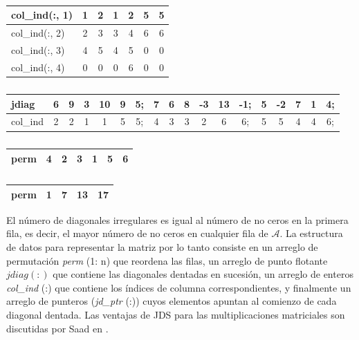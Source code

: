 \documentclass[a4paper,openright,12pt, oneside]{book}
\begin{document}
\begin{table}[htdp]
    
    \centering
    \begin{tabular}{| l || c | c | c | c | c | c |}
        \hline
      col\_ind(:, 1) & 1 & 2 & 1 & 2 & 5 & 5 \\ \hline
      col\_ind(:, 2) & 2 & 3 & 3 & 4 & 6 & 6 \\ \hline
      col\_ind(:, 3) & 4 & 5 & 4 & 5 & 0 & 0 \\ \hline
      col\_ind(:, 4) & 0 & 0 & 0 & 6 & 0 & 0 \\ \hline
    \end{tabular}
    \caption{}
\end{table}

\begin{table}[!b]
    
    \begin{tabular}{ | l || c | c | c | c | c | c | c | c | c | c | c | c | c | c | c | c | c |}
        \hline
      jdiag & 6 & 9 & 3 & 10 & 9 & 5; & 7 & 6 & 8 & -3 & 13 & -1; & 5 & -2 & 7 & 1 & 4; \\ \hline
      col\_ind & 2 & 2 & 1 & 1 & 5 & 5; & 4 & 3 & 3 & 2 & 6 & 6; & 5 & 5 & 4 & 4 & 6; \\ \hline
    \end{tabular}
    \caption{}
\end{table}

\begin{table}[!b]
    \centering
    \begin{tabular}{ | l || c | c | c | c | c | c |}
        \hline
        perm & 4 & 2 & 3 & 1 & 5 & 6 \\ \hline
    \end{tabular}
    \caption{}
\end{table}

\begin{table}[!b]
    \centering
    \begin{tabular}{ | l || c | c | c | c | }
        \hline
      perm & 1 & 7 & 13 & 17 \\ \hline
    \end{tabular}
    \caption{}
\end{table}


El n\'umero de diagonales irregulares es igual al n\'umero de no ceros en la primera fila, es decir, el mayor n\'umero de no ceros en cualquier fila de $\mathcal{A}$. La estructura de datos para representar la matriz por lo tanto consiste en un arreglo de permutaci\'on \textit{perm} (1: n) que reordena las filas, un arreglo de punto flotante $jdiag (:)$ que contiene las diagonales dentadas en sucesi\'on, un arreglo de enteros \textit{col\_ind} (:) que contiene los \'indices de columna correspondientes, y finalmente un arreglo de punteros (\textit{jd\_ptr} (:)) cuyos elementos apuntan al comienzo de cada diagonal dentada. Las ventajas de JDS para las multiplicaciones matriciales son discutidas por Saad en \cite{JDS}.
\end{document}
